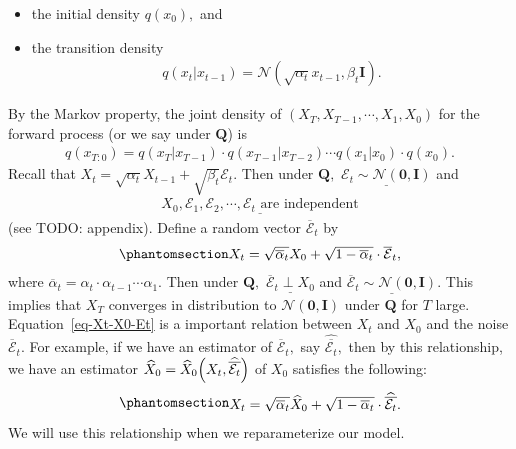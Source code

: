 \documentclass[
]{article}
\providecommand{\tightlist}{%
  \setlength{\itemsep}{0pt}\setlength{\parskip}{0pt}}\usepackage{longtable,booktabs,array}
\theoremstyle{remark}
\begin{document}
\begin{itemize}
\tightlist
\item
  the initial density \(q(x_0),\) and
\item
  the transition density \[
  \begin{aligned}
    q(x_t\vert x_{t-1}) = \mathcal{N} (\sqrt{\alpha_t}x_{t-1},\beta_t \mathbf{I}).
  \end{aligned}
  \]
\end{itemize}

By the Markov property, the joint density of
\((X_T, X_{T-1},\cdots, X_1, X_0)\) for the forward process (or we say
under \(\mathbf{Q}\)) is \[
\begin{aligned}
  q(x_{T:0}) = q(x_T\vert x_{T-1}) \cdot q(x_{T-1}\vert x_{T-2}) \cdots q(x_{1}\vert x_0) \cdot q(x_0).
\end{aligned}
\] Recall that
\(X_t = \sqrt{\alpha_{t}}X_{t-1} + \sqrt{\beta_t}\mathcal{E}_t.\) Then
under \(\mathbf{Q},\)
\(\underline{\mathcal{E}_t\sim \mathcal{N}(\mathbf{0},\mathbf{I})}\) and
\[
\begin{aligned}
  \underline{X_0,\mathcal{E}_1,\mathcal{E}_2,\cdots,\mathcal{E}_t\text{ are independent}}
\end{aligned}
\] (see TODO: appendix). Define a random vector
\(\overline{\mathcal{E}}_t\) by
\begin{equation}\phantomsection\label{eq-Xt-X0-Et}{
\begin{aligned}
  X_t = \sqrt{\overline{\alpha}_t}X_0 + \sqrt{1-\overline{\alpha}_t} \cdot \overline{\mathcal{E}}_t,
\end{aligned}
}\end{equation} where
\(\overline{\alpha}_t = \alpha_t\cdot \alpha_{t-1}\cdots \alpha_1.\)
Then under \(\mathbf{Q},\)
\(\underline{\overline{\mathcal{E}}_t\perp X_0}\) and
\(\underline{\overline{\mathcal{E}}_t\sim \mathcal{N}(\mathbf{0},\mathbf{I})}.\)
This implies that \(X_T\) converges in distribution to
\(\mathcal{N}(\mathbf{0},\mathbf{I})\) under \(\mathbf{Q}\) for \(T\)
large. Equation~\ref{eq-Xt-X0-Et} is a important relation between
\(X_t\) and \(X_0\) and the noise \(\overline{\mathcal{E}}_t.\) For
example, if we have an estimator of \(\overline{\mathcal{E}}_t,\) say
\(\widehat{\overline{\mathcal{E}_t}},\) then by this relationship, we
have an estimator
\(\widehat{X}_0 = \widehat{X}_0\Bigl(X_t,\widehat{\overline{\mathcal{E}_t}}\Bigr)\)
of \(X_0\) satisfies the following:
\begin{equation}\phantomsection\label{eq-estimator-X0}{
\begin{aligned}
  X_t = \sqrt{\overline{\alpha}_t} \widehat{X}_0 + \sqrt{1-\overline{\alpha}_t} \cdot \widehat{\overline{\mathcal{E}_t}}.
\end{aligned}
}\end{equation} We will use this relationship when we reparameterize our
model.
\end{document}
